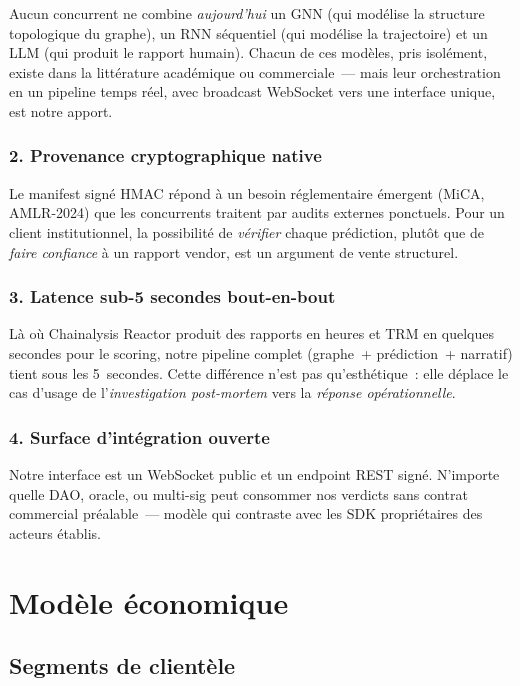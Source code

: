 \documentclass[11pt,a4paper]{article}
\begin{document}
Aucun concurrent ne combine \emph{aujourd'hui} un GNN (qui modélise la
structure topologique du graphe), un RNN séquentiel (qui modélise la
trajectoire) et un LLM (qui produit le rapport humain). Chacun de ces
modèles, pris isolément, existe dans la littérature académique ou
commerciale~--- mais leur orchestration en un pipeline temps réel,
avec broadcast WebSocket vers une interface unique, est notre apport.

\subsubsection{2. Provenance cryptographique native}

Le manifest signé HMAC répond à un besoin réglementaire émergent
(MiCA, AMLR-2024) que les concurrents traitent par audits externes
ponctuels. Pour un client institutionnel, la possibilité de
\emph{vérifier} chaque prédiction, plutôt que de \emph{faire confiance}
à un rapport vendor, est un argument de vente structurel.

\subsubsection{3. Latence sub-5 secondes bout-en-bout}

Là où Chainalysis Reactor produit des rapports en heures et TRM en
quelques secondes pour le scoring, notre pipeline complet (graphe~+
prédiction~+ narratif) tient sous les 5~secondes. Cette différence
n'est pas qu'esthétique~: elle déplace le cas d'usage de
l'\emph{investigation post-mortem} vers la \emph{réponse opérationnelle}.

\subsubsection{4. Surface d'intégration ouverte}

Notre interface est un WebSocket public et un endpoint REST signé.
N'importe quelle DAO, oracle, ou multi-sig peut consommer nos verdicts
sans contrat commercial préalable~--- modèle qui contraste avec les
SDK propriétaires des acteurs établis.

\section{Modèle économique}

\subsection{Segments de clientèle}
\end{document}
